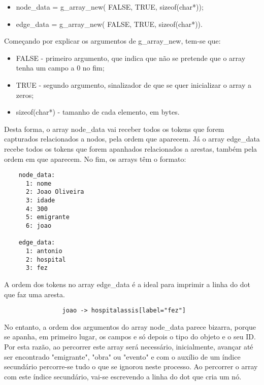 \documentclass[a4paper]{article}
\begin{document}
\begin{itemize}
    \item node\_data = g\_array\_new( FALSE, TRUE, sizeof(char*));
    \item edge\_data = g\_array\_new( FALSE, TRUE, sizeof(char*)).
\end{itemize}

\bigskip
\par Começando por explicar os argumentos de g\_array\_new, tem-se que:

\begin{itemize}
    \item FALSE - primeiro argumento, que indica que não se pretende que o array tenha um campo a 0 no fim;
    \item TRUE - segundo argumento, sinalizador de que se quer inicializar o array a zeros;
    \item sizeof(char*) - tamanho de cada elemento, em bytes.
\end{itemize}

\bigskip
\par Desta forma, o array node\_data vai receber todos os tokens que forem capturados relacionados a nodos, pela ordem que aparecem. Já o array edge\_data recebe todos os tokens que forem apanhados relacionados a arestas, também pela ordem em que aparecem. No fim, os arrays têm o formato:

\bigskip
\lstset{language=tex}
\begin{lstlisting}
    node_data:
      1: nome
      2: Joao Oliveira
      3: idade
      4: 300
      5: emigrante
      6: joao
    
    edge_data:
      1: antonio
      2: hospital
      3: fez
\end{lstlisting}

\bigskip
\par A ordem dos tokens no array edge\_data é a ideal para imprimir a linha do dot que faz uma aresta.

\lstset{language=tex}
\begin{lstlisting}
                joao -> hospitalassis[label="fez"]
\end{lstlisting}

\bigskip
\par No entanto, a ordem dos argumentos do array node\_data parece bizarra, porque se apanha, em primeiro lugar, os campos e só depois o tipo do objeto e o seu ID. Por esta razão, ao percorrer este array será necessário, inicialmente, avançar até ser encontrado "emigrante", "obra" ou "evento" e com o auxílio de um índice secundário percorre-se tudo o que se ignorou neste processo. Ao percorrer o array com este índice secundário, vai-se escrevendo a linha do dot que cria um nó.
\end{document}
